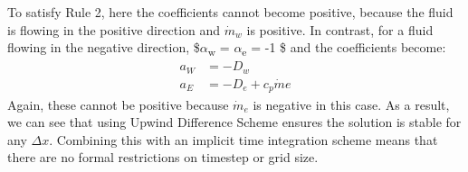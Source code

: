\documentclass[11pt]{article}
\begin{document}
To satisfy Rule 2, here the coefficients cannot become positive, because the fluid is flowing in the positive direction
and \(\dot{m}_w\) is positive. In contrast, for a fluid flowing in the negative direction, \$\(\alpha\)\textsubscript{w} = \(\alpha\)\textsubscript{e} = -1 \$ and
the coefficients become:
\begin{equation*}
\begin{aligned}
a_W &= -D_w\\
a_E &= -D_e + c_p \dot{m}e
\end{aligned}
\end{equation*}
Again, these cannot be positive because \(\dot{m}_e\) is negative in this case. As a result, we can see that using Upwind Difference
Scheme ensures the solution is stable for any \(\Delta x\). Combining this with an implicit time integration scheme means that
there are no formal restrictions on timestep or grid size. 
\end{document}
